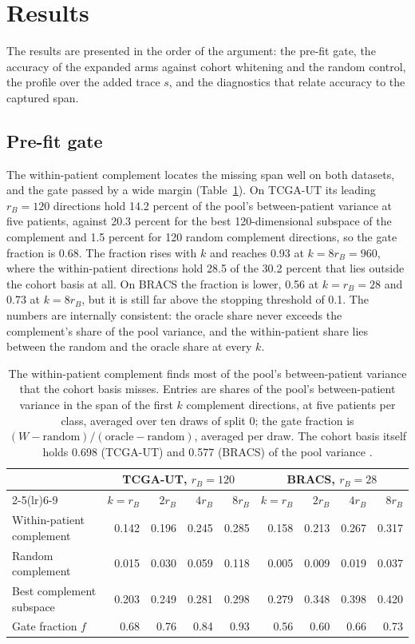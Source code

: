 \section{Results}
\label{sec:results}
The results are presented in the order of the argument: the pre-fit gate, the accuracy of the expanded arms against cohort whitening and the random control, the profile over the added trace $s$, and the diagnostics that relate accuracy to the captured span.

\subsection{Pre-fit gate}
\label{sec:gate-results}
The within-patient complement locates the missing span well on both datasets, and the gate passed by a wide margin (Table~\ref{tab:gate}). On TCGA-UT its leading $r_B=120$ directions hold 14.2 percent of the pool's between-patient variance at five patients, against 20.3 percent for the best 120-dimensional subspace of the complement and 1.5 percent for 120 random complement directions, so the gate fraction is 0.68. The fraction rises with $k$ and reaches 0.93 at $k=8r_B=960$, where the within-patient directions hold 28.5 of the 30.2 percent that lies outside the cohort basis at all. On BRACS the fraction is lower, 0.56 at $k=r_B=28$ and 0.73 at $k=8r_B$, but it is still far above the stopping threshold of 0.1. The numbers are internally consistent: the oracle share never exceeds the complement's share of the pool variance, and the within-patient share lies between the random and the oracle share at every $k$.

\begin{table}[htbp]
\centering
\small
\renewcommand{\arraystretch}{1.15}
\begin{tabular}{@{}lrrrrrrrr@{}}
\toprule
 & \multicolumn{4}{c}{TCGA-UT, $r_B=120$} & \multicolumn{4}{c}{BRACS, $r_B=28$} \\
\cmidrule(lr){2-5}\cmidrule(lr){6-9}
 & $k=r_B$ & $2r_B$ & $4r_B$ & $8r_B$ & $k=r_B$ & $2r_B$ & $4r_B$ & $8r_B$ \\
\midrule
Within-patient complement & 0.142 & 0.196 & 0.245 & 0.285 & 0.158 & 0.213 & 0.267 & 0.317 \\
Random complement & 0.015 & 0.030 & 0.059 & 0.118 & 0.005 & 0.009 & 0.019 & 0.037 \\
Best complement subspace & 0.203 & 0.249 & 0.281 & 0.298 & 0.279 & 0.348 & 0.398 & 0.420 \\
\addlinespace
Gate fraction $f$ & 0.68 & 0.76 & 0.84 & 0.93 & 0.56 & 0.60 & 0.66 & 0.73 \\
\bottomrule
\end{tabular}
\caption{The within-patient complement finds most of the pool's between-patient variance that the cohort basis misses. Entries are shares of the pool's between-patient variance in the span of the first $k$ complement directions, at five patients per class, averaged over ten draws of split 0; the gate fraction is $(W-\text{random})/(\text{oracle}-\text{random})$, averaged per draw. The cohort basis itself holds 0.698 (TCGA-UT) and 0.577 (BRACS) of the pool variance \citep{queisler2026spectrumRegularization}.}
\label{tab:gate}
\end{table}

